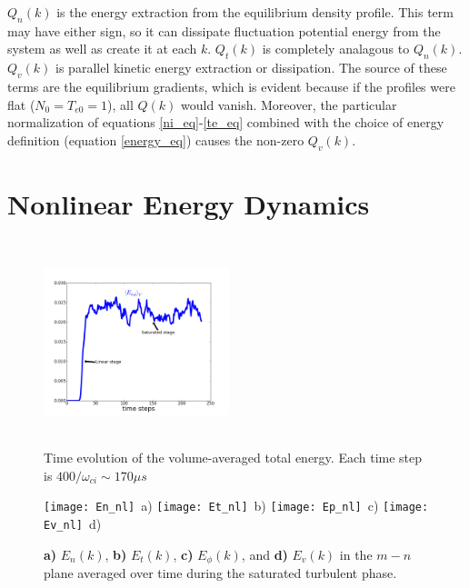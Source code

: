 \documentclass[12pt]{article}
\begin{document}
$Q_n(k)$ is the energy extraction from the equilibrium density profile. This term may have either sign, so it can dissipate fluctuation potential energy from the system as well as create it
at each $k$. $Q_t(k)$ is completely analagous to $Q_n(k)$. 
$Q_v(k)$ is parallel kinetic energy extraction or dissipation. The source of these terms are the equilibrium gradients, which is evident because if the profiles
were flat ($N_0=T_{e0}=1$), all $Q(k)$ would vanish.
Moreover, the particular normalization of equations \ref{ni_eq}-\ref{te_eq} combined with the choice of energy definition (equation \ref{energy_eq}) causes the non-zero $Q_v(k)$.

\section{Nonlinear Energy Dynamics}
\label{nl_en_dynamics_sec}

\begin{figure}
\includegraphics[width=0.48\textwidth,height=60mm]{time_evolution}
\hfil
\caption{Time evolution of the volume-averaged total energy. Each time step is $400/\omega_{ci} \sim 170 \mu s$}
\label{time_evolution}
\end{figure}


\begin{figure}
\texttt{[image: En\_nl]}~a)
\hfil
\texttt{[image: Et\_nl]}~b)
\hfil
\texttt{[image: Ep\_nl]}~c)
\hfil
\texttt{[image: Ev\_nl]}~d)
\hfil
\caption{\textbf{a)} $E_n(k)$, \textbf{b)} $E_t(k)$, \textbf{c)} $E_\phi(k)$, and \textbf{d)} $E_v(k)$ in the $m-n$ plane averaged over time during the saturated turbulent phase.}
\label{energy_figures}
\end{figure}
\end{document}
